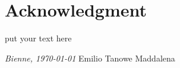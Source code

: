 \chapter*{Acknowledgment}
put your text here
%
%
%
%
%


\bigskip
 
\noindent\textit{Bienne, \today}
\hfill Emilio Tanowe Maddalena
